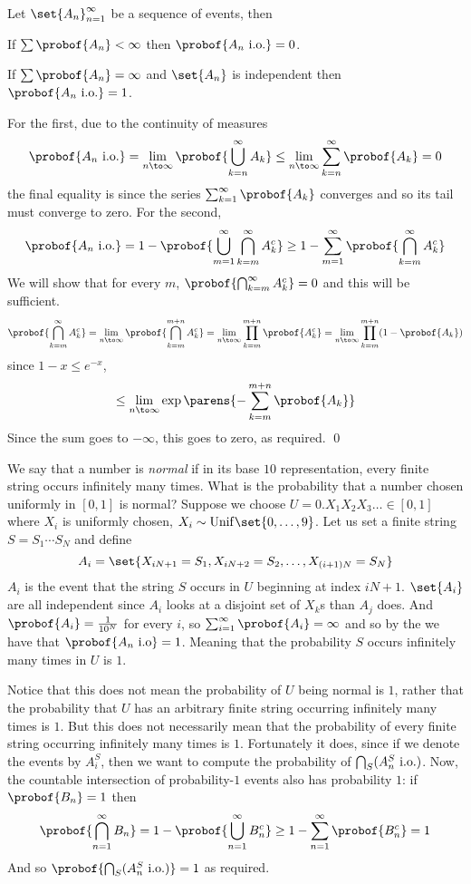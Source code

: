 \blemm[title=Borel-Cantelli Lemma, name=bclemm]

    Let $\set{A_n}_{n=1}^\infty$ be a sequence of events, then
    \benum
        \item If $\sum\probof{A_n}<\infty$ then $\probof{A_n\hbox{ i.o.}}=0$.
        \item If $\sum\probof{A_n}=\infty$ and $\set{A_n}$ is independent then $\probof{A_n\hbox{ i.o.}}=1$.
    \eenum

\elemm

For the first, due to the continuity of measures
$$ \probof{A_n\hbox{ i.o.}} = \lim_{n\to\infty}\probof{\bigcup_{k=n}^\infty A_k} \leq \lim_{n\to\infty}\sum_{k=n}^\infty\probof{A_k} = 0 $$
the final equality is since the series $\sum_{k=1}^\infty\probof{A_k}$ converges and so its tail must converge to zero.
For the second,
$$ \probof{A_n\hbox{ i.o.}} = 1 - \probof{\bigcup_{m=1}^\infty\bigcap_{k=m}^\infty A_k^c} \geq 1 - \sum_{m=1}^\infty\probof{\bigcap_{k=m}^\infty A_k^c} $$
We will show that for every $m$, $\probof{\bigcap_{k=m}^\infty A_k^c}=0$ and this will be sufficient.
$$ \probof{\bigcap_{k=m}^\infty A_k^c} = \lim_{n\to\infty}\probof{\bigcap_{k=m}^{m+n}A_k^c} = \lim_{n\to\infty}\prod_{k=m}^{m+n}\probof{A_k^c} = \lim_{n\to\infty}\prod_{k=m}^{m+n}(1-\probof{A_k}) $$
since $1-x\leq e^{-x}$,
$$ \leq \lim_{n\to\infty}\exp\parens{-\sum_{k=m}^{m+n}\probof{A_k}} $$
Since the sum goes to $-\infty$, this goes to zero, as required.
\qed

\bexam

    We say that a number is {\it normal} if in its base $10$ representation, every finite string occurs infinitely many times.
    What is the probability that a number chosen uniformly in $[0,1]$ is normal?
    Suppose we choose $U=0.X_1X_2X_3\dots\in[0,1]$ where $X_i$ is uniformly chosen, $X_i\sim{\rm Unif}\set{0,\dots,9}$.
    Let us set a finite string $S=S_1\cdots S_N$ and define
    $$ A_i = \set{X_{iN+1}=S_1,X_{iN+2}=S_2,\dots,X_{(i+1)N}=S_N} $$
    $A_i$ is the event that the string $S$ occurs in $U$ beginning at index $iN+1$.
    $\set{A_i}$ are all independent since $A_i$ looks at a disjoint set of $X_k$s than $A_j$ does.
    And $\probof{A_i}=\frac1{10^N}$ for every $i$, so $\sum_{i=1}^\infty\probof{A_i}=\infty$ and so by the  we have that $\probof{A_n\hbox{ i.o}}=1$.
    Meaning that the probability $S$ occurs infinitely many times in $U$ is $1$.

    Notice that this does not mean the probability of $U$ being normal is $1$, rather that the probability that $U$ has an arbitrary finite string occurring infinitely many times is $1$.
    But this does not necessarily mean that the probability of every finite string occurring infinitely many times is $1$.
    Fortunately it does, since if we denote the events by $A_i^S$, then we want to compute the probability of $\bigcap_S(A_n^S\hbox{ i.o.})$.
    Now, the countable intersection of probability-$1$ events also has probability $1$: if $\probof{B_n}=1$ then
    $$ \probof{\bigcap_{n=1}^\infty B_n} = 1 - \probof{\bigcup_{n=1}^\infty B_n^c} \geq 1 - \sum_{n=1}^\infty\probof{B_n^c} = 1 $$
    And so $\probof{\bigcap_S(A_n^S\hbox{ i.o.})}=1$ as required.

